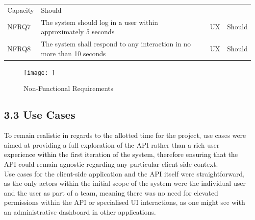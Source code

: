 \documentclass[12pt]{report}
\begin{document}
\begin{longtable}[]{@{}llll@{}}
\begin{minipage}[t]{0.10\columnwidth}
Capacity\strut
\end{minipage} & \begin{minipage}[t]{0.11\columnwidth}\raggedright\strut
Should\strut
\end{minipage}\tabularnewline
\begin{minipage}[t]{0.05\columnwidth}\raggedright\strut
NFRQ7\strut
\end{minipage} & \begin{minipage}[t]{0.63\columnwidth}\raggedright\strut
The system should log in a user within approximately 5 seconds\strut
\end{minipage} & \begin{minipage}[t]{0.10\columnwidth}\raggedright\strut
UX\strut
\end{minipage} & \begin{minipage}[t]{0.11\columnwidth}\raggedright\strut
Should\strut
\end{minipage}\tabularnewline
\begin{minipage}[t]{0.05\columnwidth}\raggedright\strut
NFRQ8\strut
\end{minipage} & \begin{minipage}[t]{0.63\columnwidth}\raggedright\strut
The system shall respond to any interaction in no more than 10
seconds\strut
\end{minipage} & \begin{minipage}[t]{0.10\columnwidth}\raggedright\strut
UX\strut
\end{minipage} & \begin{minipage}[t]{0.11\columnwidth}\raggedright\strut
Should\strut
\end{minipage}\tabularnewline
\bottomrule
\end{longtable}

\begin{figure}[htbp]
\centering
\texttt{[image: ]}
\caption{Non-Functional Requirements}
\end{figure}

\subsection{3.3 Use Cases}\label{use-cases}

To remain realistic in regards to the allotted time for the project, use
cases were aimed at providing a full exploration of the API rather than
a rich user experience within the first iteration of the system,
therefore ensuring that the API could remain agnostic regarding any
particular client-side context.\\
Use cases for the client-side application and the API itself were
straightforward, as the only actors within the initial scope of the
system were the individual user and the user as part of a team, meaning
there was no need for elevated permissions within the API or specialised
UI interactions, as one might see with an administrative dashboard in
other applications.
\end{document}
